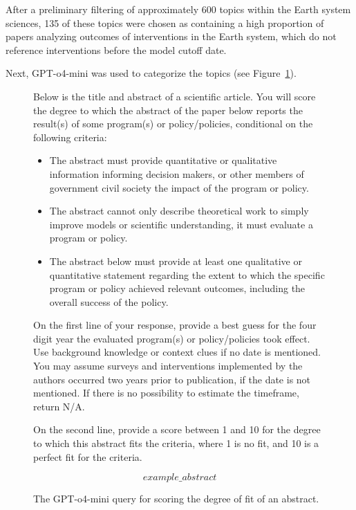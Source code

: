 \documentclass[12pt,a4paper]{article}
\begin{document}
After a preliminary filtering of approximately 600 topics within the Earth system sciences, 135 of these topics were chosen as containing a high proportion of papers analyzing outcomes of interventions in the Earth system, which do not reference interventions before the model cutoff date. 

Next, GPT-o4-mini was used to categorize the topics (see Figure~\ref{fig:scoringfigure}).

\begin{figure}[htbp]
  \centering
  \begin{tcolorbox}[left=4pt, right=4pt, top=4pt, bottom=4pt]
\ttfamily\footnotesize
Below is the title and abstract of a scientific article. 
You will score the degree to which the abstract of the paper below reports the result(s) of some program(s) or policy/policies, conditional on the following criteria: 

\begin{itemize}
 \item The abstract must provide quantitative or qualitative information informing decision makers, or other members of government civil society the impact of the program or policy. 
 \item The abstract cannot only describe theoretical work to simply improve models or scientific understanding, it must evaluate a program or policy. 
 \item The abstract below must provide at least one qualitative or quantitative statement regarding the extent to which the specific program or policy achieved relevant outcomes, including the overall success of the policy.  
\end{itemize}
On the first line of your response, provide a best guess for the four digit year the evaluated program(s) or policy/policies took effect. Use background knowledge or context clues if no date is mentioned. You may assume surveys and interventions implemented by the authors occurred two years prior to publication, if the date is not mentioned. If there is no possibility to estimate the timeframe, return N/A.

On the second line, provide a score between 1 and 10 for the degree to which this abstract fits the criteria, where 1 is no fit, and 10 is a perfect fit for the criteria.

\[example\_abstract\]
  \end{tcolorbox}
  \caption{The GPT-o4-mini query for scoring the degree of fit of an abstract.}
  \label{fig:scoringfigure}
\end{figure}
\end{document}
